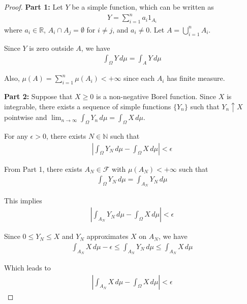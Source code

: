 \begin{proof}
    \textbf{Part 1:} Let $Y$ be a simple function, which can be written as
    \begin{align*}
        Y = \sum_{i=1}^n a_i 1_{A_i}
    \end{align*}
    where $a_i \in \mathbb{R}$, $A_i \cap A_j = \emptyset$ for $i \neq j$, and $a_i \neq 0$. Let $A = \bigcup_{i=1}^n A_i$. 
    
    Since $Y$ is zero outside $A$, we have
    \begin{align*}
        \int_\Omega Y \, d\mu = \int_A Y \, d\mu
    \end{align*}
    
    Also, $\mu(A) = \sum_{i=1}^n \mu(A_i) < +\infty$ since each $A_i$ has finite measure.
    
    \textbf{Part 2:} Suppose that $X \geq 0$ is a non-negative Borel function. Since $X$ is integrable, there exists a sequence of simple functions $\{Y_n\}$ such that $Y_n \uparrow X$ pointwise and $\lim_{n \to \infty} \int_\Omega Y_n \, d\mu = \int_\Omega X \, d\mu$.
    
    For any $\epsilon > 0$, there exists $N \in \mathbb{N}$ such that
    \begin{align*}
        \left|\int_\Omega Y_N \, d\mu - \int_\Omega X \, d\mu\right| < \epsilon
    \end{align*}
    
    From Part 1, there exists $A_N \in \mathcal{F}$ with $\mu(A_N) < +\infty$ such that
    \begin{align*}
        \int_\Omega Y_N \, d\mu = \int_{A_N} Y_N \, d\mu
    \end{align*}
    
    This implies
    \begin{align*}
        \left|\int_{A_N} Y_N \, d\mu - \int_\Omega X \, d\mu\right| < \epsilon
    \end{align*}
    
    Since $0 \leq Y_N \leq X$ and $Y_N$ approximates $X$ on $A_N$, we have
    \begin{align*}
        \int_{A_N} X \, d\mu - \epsilon \leq \int_{A_N} Y_N \, d\mu \leq \int_{A_N} X \, d\mu
    \end{align*}
    
    Which leads to
    \begin{align*}
        \left|\int_{A_N} X \, d\mu - \int_\Omega X \, d\mu\right| < \epsilon
    \end{align*}
    

\end{proof}

